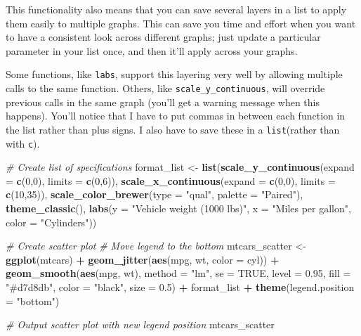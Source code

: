 \documentclass[
  openany]{book}
\newenvironment{Shaded}{\begin{snugshade}}{\end{snugshade}}
\newcommand{\CommentTok}[1]{\textcolor[rgb]{0.56,0.35,0.01}{\textit{#1}}}
\newcommand{\DataTypeTok}[1]{\textcolor[rgb]{0.13,0.29,0.53}{#1}}
\newcommand{\DecValTok}[1]{\textcolor[rgb]{0.00,0.00,0.81}{#1}}
\newcommand{\FloatTok}[1]{\textcolor[rgb]{0.00,0.00,0.81}{#1}}
\newcommand{\KeywordTok}[1]{\textcolor[rgb]{0.13,0.29,0.53}{\textbf{#1}}}
\newcommand{\NormalTok}[1]{#1}
\newcommand{\OperatorTok}[1]{\textcolor[rgb]{0.81,0.36,0.00}{\textbf{#1}}}
\newcommand{\OtherTok}[1]{\textcolor[rgb]{0.56,0.35,0.01}{#1}}
\newcommand{\StringTok}[1]{\textcolor[rgb]{0.31,0.60,0.02}{#1}}
\begin{document}
This functionality also means that you can save several layers in a list to apply them easily to multiple graphs. This can save you time and effort when you want to have a consistent look across different graphs; just update a particular parameter in your list once, and then it'll apply across your graphs.

Some functions, like \texttt{labs}, support this layering very well by allowing multiple calls to the same function. Others, like \texttt{scale\_y\_continuous}, will override previous calls in the same graph (you'll get a warning message when this happens). You'll notice that I have to put commas in between each function in the list rather than plus signs. I also have to save these in a \texttt{list}(rather than with \texttt{c}).

\begin{Shaded}
\begin{Highlighting}[]
\CommentTok{# Create list of specifications}
\NormalTok{format_list <-}\StringTok{ }\KeywordTok{list}\NormalTok{(}\KeywordTok{scale_y_continuous}\NormalTok{(}\DataTypeTok{expand =} \KeywordTok{c}\NormalTok{(}\DecValTok{0}\NormalTok{,}\DecValTok{0}\NormalTok{), }\DataTypeTok{limits =} \KeywordTok{c}\NormalTok{(}\DecValTok{0}\NormalTok{,}\DecValTok{6}\NormalTok{)),}
                    \KeywordTok{scale_x_continuous}\NormalTok{(}\DataTypeTok{expand =} \KeywordTok{c}\NormalTok{(}\DecValTok{0}\NormalTok{,}\DecValTok{0}\NormalTok{), }\DataTypeTok{limits =} \KeywordTok{c}\NormalTok{(}\DecValTok{10}\NormalTok{,}\DecValTok{35}\NormalTok{)),}
                    \KeywordTok{scale_color_brewer}\NormalTok{(}\DataTypeTok{type =} \StringTok{"qual"}\NormalTok{, }\DataTypeTok{palette =} \StringTok{"Paired"}\NormalTok{),}
                    \KeywordTok{theme_classic}\NormalTok{(),}
                    \KeywordTok{labs}\NormalTok{(}\DataTypeTok{y =} \StringTok{"Vehicle weight (1000 lbs)"}\NormalTok{,}
                         \DataTypeTok{x =} \StringTok{"Miles per gallon"}\NormalTok{,}
                         \DataTypeTok{color =} \StringTok{"Cylinders"}\NormalTok{))}

\CommentTok{# Create scatter plot}
  \CommentTok{# Move legend to the bottom}
\NormalTok{mtcars_scatter <-}\StringTok{ }\KeywordTok{ggplot}\NormalTok{(mtcars) }\OperatorTok{+}
\StringTok{  }\KeywordTok{geom_jitter}\NormalTok{(}\KeywordTok{aes}\NormalTok{(mpg, wt, }\DataTypeTok{color =}\NormalTok{ cyl)) }\OperatorTok{+}
\StringTok{  }\KeywordTok{geom_smooth}\NormalTok{(}\KeywordTok{aes}\NormalTok{(mpg, wt), }\DataTypeTok{method =} \StringTok{"lm"}\NormalTok{, }\DataTypeTok{se =} \OtherTok{TRUE}\NormalTok{, }\DataTypeTok{level =} \FloatTok{0.95}\NormalTok{, }
              \DataTypeTok{fill =} \StringTok{"#d7d8db"}\NormalTok{, }\DataTypeTok{color =} \StringTok{"black"}\NormalTok{, }\DataTypeTok{size =} \FloatTok{0.5}\NormalTok{) }\OperatorTok{+}
\StringTok{  }\NormalTok{format_list }\OperatorTok{+}
\StringTok{  }\KeywordTok{theme}\NormalTok{(}\DataTypeTok{legend.position =} \StringTok{"bottom"}\NormalTok{)}

\CommentTok{# Output scatter plot with new legend position}
\NormalTok{mtcars_scatter}
\end{Highlighting}
\end{Shaded}
\end{document}
